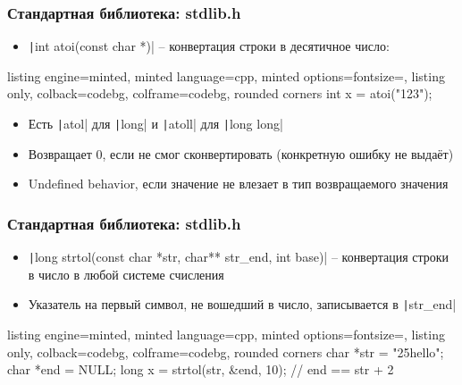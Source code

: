 \documentclass[10pt]{beamer}
\begin{document}
\begin{frame}[fragile]
\frametitle{Стандартная библиотека: stdlib.h}
\begin{itemize}
\item \texttt|int atoi(const char *)| -- конвертация строки в десятичное число:
\end{itemize}
\begin{tcblisting}{listing engine=minted, minted language=cpp, minted options={fontsize=\scriptsize}, listing only, colback=codebg, colframe=codebg, rounded corners}
int x = atoi("123");
\end{tcblisting}
\pause
{}
\begin{itemize}
\item Есть \texttt|atol| для \texttt|long| и \texttt|atoll| для \texttt|long long|
\pause
\item Возвращает 0, если не смог сконвертировать (конкретную ошибку не выдаёт)
\pause
\item Undefined behavior, если значение не влезает в тип возвращаемого значения
\end{itemize}
\end{frame}

\begin{frame}[fragile]
\frametitle{Стандартная библиотека: stdlib.h}
\begin{itemize}
\item \texttt|long strtol(const char *str, char** str_end, int base)| -- конвертация строки в число в любой системе счисления
\pause
\item Указатель на первый символ, не вошедший в число, записывается в \texttt|str_end|
\end{itemize}
\pause
{}
\begin{tcblisting}{listing engine=minted, minted language=cpp, minted options={fontsize=\scriptsize}, listing only, colback=codebg, colframe=codebg, rounded corners}
char *str = "25hello";
char *end = NULL;
long x = strtol(str, &end, 10);
// end == str + 2
\end{tcblisting}
\end{frame}
\end{document}
